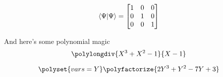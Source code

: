   \begin{equation}
    \bra{\Psi}\ket{\Psi} = \begin{bmatrix}            %
                              1 & 0 & 0 \\
                              0 & 1 & 0 \\
                              0 & 0 & 1 \\
                            \end{bmatrix}
  \end{equation}
  
  And here's some polynomial magic
  \begin{equation}
    \polylongdiv{X^3 + X^2 - 1}{X-1}                  %
  \end{equation}

  \begin{equation}
    \polyset{vars=Y}
    \polyfactorize{2Y^3 + Y^2 - 7Y + 3}               %
  \end{equation}

  

